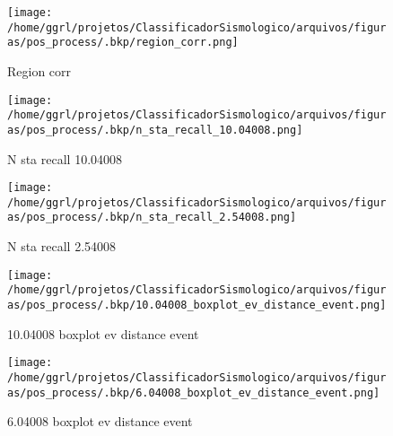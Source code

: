                     \begin{figure}[H]
                        \centering
                        \texttt{[image: /home/ggrl/projetos/ClassificadorSismologico/arquivos/figuras/pos\_process/.bkp/region\_corr.png]}
                        \caption{Region corr}
                        \label{fig:region_corr}
                    \end{figure}
                

                    \begin{figure}[H]
                        \centering
                        \texttt{[image: /home/ggrl/projetos/ClassificadorSismologico/arquivos/figuras/pos\_process/.bkp/n\_sta\_recall\_10.04008.png]}
                        \caption{N sta recall 10.04008}
                        \label{fig:n_sta_recall_10.04008}
                    \end{figure}
                

                    \begin{figure}[H]
                        \centering
                        \texttt{[image: /home/ggrl/projetos/ClassificadorSismologico/arquivos/figuras/pos\_process/.bkp/n\_sta\_recall\_2.54008.png]}
                        \caption{N sta recall 2.54008}
                        \label{fig:n_sta_recall_2.54008}
                    \end{figure}
                

                    \begin{figure}[H]
                        \centering
                        \texttt{[image: /home/ggrl/projetos/ClassificadorSismologico/arquivos/figuras/pos\_process/.bkp/10.04008\_boxplot\_ev\_distance\_event.png]}
                        \caption{10.04008 boxplot ev distance event}
                        \label{fig:10.04008_boxplot_ev_distance_event}
                    \end{figure}
                

                    \begin{figure}[H]
                        \centering
                        \texttt{[image: /home/ggrl/projetos/ClassificadorSismologico/arquivos/figuras/pos\_process/.bkp/6.04008\_boxplot\_ev\_distance\_event.png]}
                        \caption{6.04008 boxplot ev distance event}
                        \label{fig:6.04008_boxplot_ev_distance_event}
                    \end{figure}
                


